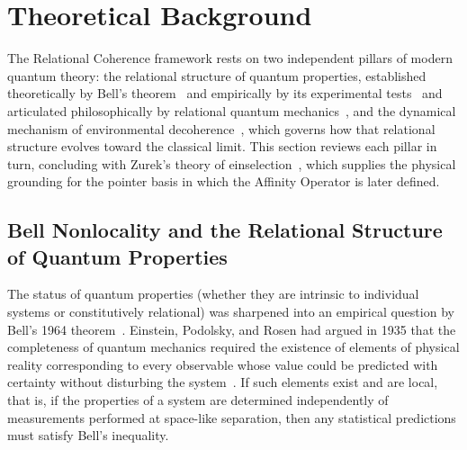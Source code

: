 
\section{\label{sec:background}Theoretical Background}

The Relational Coherence framework rests on two independent pillars of
modern quantum theory: the relational structure of quantum properties,
established theoretically by Bell's theorem~\cite{Bell1964} and
empirically by its experimental
tests~\cite{Aspect1982,Zeilinger2022Nobel} and articulated
philosophically by relational quantum
mechanics~\cite{Rovelli1996,Rovelli2021}, and the dynamical mechanism
of environmental decoherence~\cite{Zurek2003}, which governs how that
relational structure evolves toward the classical limit.
This section reviews each pillar in turn, concluding with Zurek's
theory of einselection~\cite{Zurek2003}, which supplies the physical
grounding for the pointer basis in which the Affinity Operator is later
defined.


\subsection{\label{sec:bell}Bell Nonlocality and the Relational Structure
            of Quantum Properties}

The status of quantum properties (whether they are intrinsic to individual systems or constitutively relational) was sharpened into
an empirical question by Bell's 1964 theorem~\cite{Bell1964}.
Einstein, Podolsky, and Rosen had argued in 1935 that the completeness
of quantum mechanics required the existence of elements of physical
reality corresponding to every observable whose value could be predicted
with certainty without disturbing the system~\cite{Einstein1935EPR}.
If such elements exist and are local, that is, if the properties of a system are determined independently of measurements performed at space-like separation, then any statistical predictions must satisfy
Bell's inequality.

